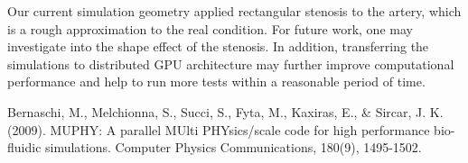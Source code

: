 \documentclass{article}
\begin{document}
Our current simulation geometry applied rectangular stenosis to the artery, which is a rough approximation to the real condition. For future work, one may investigate into the shape effect of the stenosis. In addition, transferring the simulations to distributed GPU architecture may further improve computational performance and help to run more tests within a reasonable period of time. 


  


\begin{thebibliography}{1}


\bibitem{}
Bernaschi, M., Melchionna, S., Succi, S., Fyta, M., Kaxiras, E., \& Sircar, J. K. (2009). MUPHY: A parallel MUlti PHYsics/scale code for high performance bio-fluidic simulations. Computer Physics Communications, 180(9), 1495-1502.

\end{thebibliography}
\end{document}
